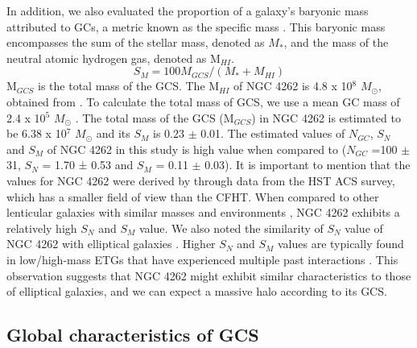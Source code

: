 \documentclass[fleqn,usenatbib]{mnras}
\begin{document}
In addition, we also evaluated the proportion of a galaxy's baryonic mass attributed to GCs, a metric known as the specific mass \citep[S${_M}$,][]{2008peng,2010Georgiev}. This baryonic mass encompasses the sum of the stellar mass, denoted as $M_{*}$, and the mass of the neutral atomic hydrogen gas, denoted as M$_{HI}$.
\begin{equation}
S{_M} = 100 M_{GCS}/(M_{*}+M_{HI})
\end{equation}
M$_{GCS}$ is the total mass of the GCS. The M$_{HI}$ of NGC 4262 is 4.8 x 10$^{8}$ $M_\odot $, obtained from \citet{2022Yu_HImass}. To calculate the total mass of GCS, we use a mean GC mass of 2.4 x 10$^{5}$ $M_\odot $ \citep{2008Spitler,durell_ngvs2014,2016duncan}. The total mass of the GCS (M$_{GCS}$) in NGC 4262 is estimated to be 6.38 x 10$^{7}$ $M_\odot $ and its $S_M$ is 0.23 $\pm$ 0.01. The estimated values of $N_{GC}$, $S_{N}$ and $S_M$ of NGC 4262 in this study is high value when compared to \citet{2008peng} ($N_{GC}$ =100 $\pm$ 31, $S_{N}$ =  1.70 ± 0.53 and $S_M$ = 0.11 $\pm$ 0.03). It is important to mention that the values for NGC 4262 were derived by \citet{2008peng} through data from the HST ACS survey, which has a smaller field of view than the CFHT. When compared to other lenticular galaxies with similar masses and environments \citep{2015Caso,2019ko}, NGC 4262 exhibits a relatively high $S_{N}$ and $S_{M}$ value. We also noted the similarity of $S_{N}$ value of NGC 4262 with elliptical galaxies \citep[2 < $S_{N}$ < 10;][]{1981Harrisandvanderbergh}.
Higher $S_{N}$ and $S_{M}$ values are typically found in low/high-mass ETGs that have experienced multiple past interactions \citep{2010Georgiev,2013Harris}. This observation suggests that NGC 4262 might exhibit similar characteristics to those of elliptical galaxies, and we can expect a massive halo according to its GCS.

\subsection{Global characteristics of GCS}
\end{document}
